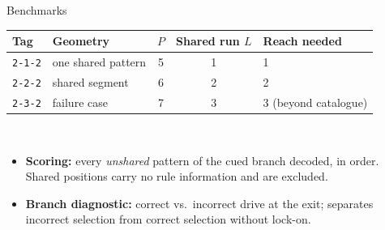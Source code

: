\documentclass[aspectratio=169]{beamer}
\begin{document}
\begin{frame}{Benchmarks}
  \centering
  \small
  \begin{tabular}{llccl}
    \toprule
    Tag & Geometry & $P$ & Shared run $L$ & Reach needed \\
    \midrule
    \texttt{2-1-2} & one shared pattern   & 5 & 1 & 1 \\
    \texttt{2-2-2} & shared segment       & 6 & 2 & 2 \\
    \texttt{2-3-2} & failure case         & 7 & 3 & 3 (beyond catalogue) \\
    \bottomrule
  \end{tabular}
  \\[3mm]
  \begin{itemize}
    \item \textbf{Scoring:} every \emph{unshared} pattern of the cued branch
      decoded, in order. Shared positions carry no rule information and are
      excluded.
    \item \textbf{Branch diagnostic:} correct vs.\ incorrect drive at the
      exit; separates incorrect selection from correct selection without
      lock-on.
  \end{itemize}
\end{frame}
\end{document}
